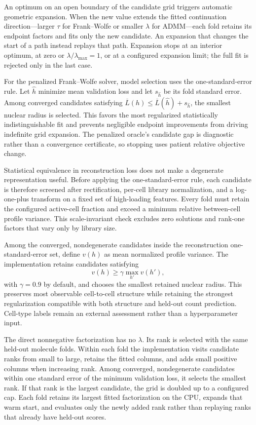 \documentclass[11pt]{article}
\begin{document}
An optimum on an open boundary of the candidate grid triggers automatic
geometric expansion. When the new value extends the fitted continuation
direction---larger \(\tau\) for Frank--Wolfe or smaller \(\lambda\) for
ADMM---each fold retains its endpoint factors and fits only the new candidate.
An expansion that changes the start of a path instead replays that path.
Expansion stops at an interior optimum, at zero or
\(\lambda/\lambda_{\max}=1\), or at a configured expansion limit; the full fit
is rejected only in the last case.

For the penalized Frank--Wolfe solver, model selection uses the
one-standard-error rule. Let \(\hat h\) minimize mean validation loss and let
\(s_{\hat h}\) be its fold standard error. Among converged candidates satisfying
\(\overline{L}(h)\leq\overline{L}(\hat h)+s_{\hat h}\), the smallest nuclear
radius is selected. This favors the most regularized statistically
indistinguishable fit and prevents negligible endpoint improvements from
driving indefinite grid expansion. The penalized oracle's candidate gap is
diagnostic rather than a convergence certificate, so stopping uses patient
relative objective change.

Statistical equivalence in reconstruction loss does not make a degenerate
representation useful. Before applying the one-standard-error rule, each
candidate is therefore screened after rectification, per-cell library
normalization, and a log-one-plus transform on a fixed set of high-loading
features. Every fold must retain the configured active-cell fraction and exceed
a minimum relative between-cell profile variance. This scale-invariant check
excludes zero solutions and rank-one factors that vary only by library size.

Among the converged, nondegenerate candidates inside the reconstruction
one-standard-error set, define \(v(h)\) as mean normalized profile variance.
The implementation retains candidates satisfying
\[
  v(h) \geq \gamma \max_{h'} v(h'),
\]
with \(\gamma=0.9\) by default, and chooses the smallest retained nuclear
radius. This preserves most observable cell-to-cell structure while retaining
the strongest regularization compatible with both structure and held-out count
prediction. Cell-type labels remain an external assessment rather than a
hyperparameter input.

The direct nonnegative factorization has no \(\lambda\). Its rank is selected
with the same held-out molecule folds. Within each fold the implementation
visits candidate ranks from small to large, retains the fitted columns, and
adds small positive columns when increasing rank. Among converged,
nondegenerate candidates within one standard error of the minimum validation
loss, it selects the smallest rank. If that rank is the largest candidate, the
grid is doubled up to a configured cap. Each fold retains its largest fitted
factorization on the CPU, expands that warm start, and evaluates only the newly
added rank rather than replaying ranks that already have held-out scores.
\end{document}
